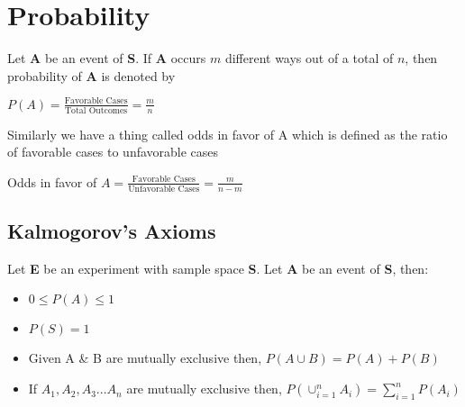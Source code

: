 \documentclass[./EngineeringMaths.tex]{subfiles}
\begin{document}
\section[Probability]{Probability}

Let \textbf{A} be an event of \textbf{S}. If \textbf{A} occurs $m$ different ways out of a total of $n$, then probability of \textbf{A} is denoted by 

\begin{center}
    $P(A) = \frac{\mbox{Favorable Cases}}{\mbox{Total Outcomes}} = \frac{m}{n}$
\end{center}

Similarly we have a thing called odds in favor of A which is defined as the ratio of favorable cases to unfavorable cases

\begin{center}
    Odds in favor of $A = \frac{\mbox{Favorable Cases}}{\mbox{Unfavorable Cases}} = \frac{m}{n-m}$
\end{center}

\subsection[Axioms on Probability]{Kalmogorov's Axioms}

Let \textbf{E} be an experiment with sample space \textbf{S}.
Let \textbf{A} be an event of \textbf{S}, then:

\begin{itemize}
\item $0 \leq P(A) \leq 1$ \label{th:1}
\item $P(S) = 1$ \label{th:2}
\item Given A \& B are mutually exclusive then, $P(A\cup B) = P(A) + P(B)$ \label{th:3}
\item If $A_1,A_2,A_3...A_n$ are mutually exclusive then, $P(\cup_{i=1}^n A_i) = \sum_{i=1}^n P(A_i)$ \label{th:4}
\end{itemize}
\end{document}
